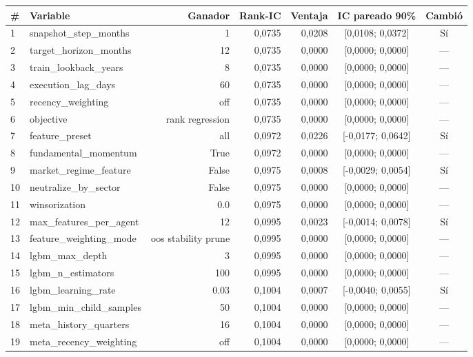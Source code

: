 \begin{tabular}{llrrrcc}
\toprule
\# & Variable & Ganador & Rank-IC & Ventaja & IC pareado 90\% & Cambió \\
\midrule
1 & snapshot\_step\_months & 1 & 0,0735 & 0,0208 & [0,0108; 0,0372] & Sí \\
2 & target\_horizon\_months & 12 & 0,0735 & 0,0000 & [0,0000; 0,0000] & — \\
3 & train\_lookback\_years & 8 & 0,0735 & 0,0000 & [0,0000; 0,0000] & — \\
4 & execution\_lag\_days & 60 & 0,0735 & 0,0000 & [0,0000; 0,0000] & — \\
5 & recency\_weighting & off & 0,0735 & 0,0000 & [0,0000; 0,0000] & — \\
6 & objective & rank regression & 0,0735 & 0,0000 & [0,0000; 0,0000] & — \\
7 & feature\_preset & all & 0,0972 & 0,0226 & [-0,0177; 0,0642] & Sí \\
8 & fundamental\_momentum & True & 0,0972 & 0,0000 & [0,0000; 0,0000] & — \\
9 & market\_regime\_feature & False & 0,0975 & 0,0008 & [-0,0029; 0,0054] & Sí \\
10 & neutralize\_by\_sector & False & 0,0975 & 0,0000 & [0,0000; 0,0000] & — \\
11 & winsorization & 0.0 & 0,0975 & 0,0000 & [0,0000; 0,0000] & — \\
12 & max\_features\_per\_agent & 12 & 0,0995 & 0,0023 & [-0,0014; 0,0078] & Sí \\
13 & feature\_weighting\_mode & oos stability prune & 0,0995 & 0,0000 & [0,0000; 0,0000] & — \\
14 & lgbm\_max\_depth & 3 & 0,0995 & 0,0000 & [0,0000; 0,0000] & — \\
15 & lgbm\_n\_estimators & 100 & 0,0995 & 0,0000 & [0,0000; 0,0000] & — \\
16 & lgbm\_learning\_rate & 0.03 & 0,1004 & 0,0007 & [-0,0040; 0,0055] & Sí \\
17 & lgbm\_min\_child\_samples & 50 & 0,1004 & 0,0000 & [0,0000; 0,0000] & — \\
18 & meta\_history\_quarters & 16 & 0,1004 & 0,0000 & [0,0000; 0,0000] & — \\
19 & meta\_recency\_weighting & off & 0,1004 & 0,0000 & [0,0000; 0,0000] & — \\
\bottomrule
\end{tabular}
